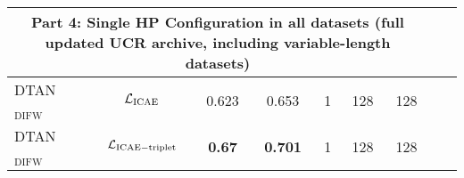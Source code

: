 \begin{table*}[t]
\begin{center}
\begin{footnotesize}
\begin{sc}
\begin{tabular}{lcccccccr}
\midrule
\multicolumn{7}{c}{Part 4: Single HP Configuration in all datasets (full updated UCR archive, including variable-length datasets)} \\ 
\midrule
DTAN$_{\mathrm{DIFW}}$~\cite{Shapira:ICML:2023:RFDTAN}  & $\mathcal{L}_{\mathrm{ICAE}}$ & 0.623 &0.653 & 1   & 128 & 128 \\
DTAN$_{\mathrm{DIFW}}$~\cite{Shapira:ICML:2023:RFDTAN}  & $\mathcal{L}_{\mathrm{ICAE-triplet}}$ & \textbf{0.67} & \textbf{0.701}  & 1   & 128 & 128  \\
\midrule
\bottomrule
\end{tabular}
\end{sc}
\end{footnotesize}
\end{center}
\vskip -0.1in
\end{table*}